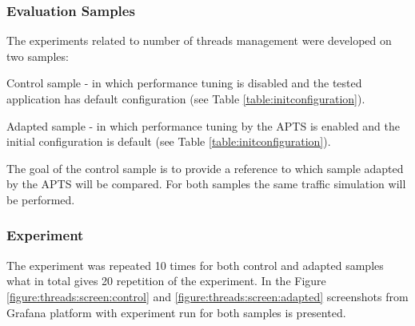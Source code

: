 \documentclass[12pt,a4paper]{article}
\let\tempone\itemize
\let\temptwo\enditemize
\renewenvironment{itemize}{\tempone\addtolength{\itemsep}{-0.4\baselineskip}}{\temptwo}
\begin{document}
 
\subsubsection{Evaluation Samples}

The experiments related to number of threads management were developed on two samples:
\begin{itemize}
\item Control sample - in which performance tuning is disabled and the tested application has default  configuration (see Table \ref{table:initconfiguration}).  
\item Adapted sample - in which performance tuning by the APTS is enabled and the initial configuration is default (see Table \ref{table:initconfiguration}).
\end{itemize}

The goal of the control sample is to provide a reference to which sample adapted by the APTS will be compared. For both samples the same traffic simulation will be performed.
 
\subsubsection{Experiment} 

The experiment was repeated 10 times for both control and adapted samples what in total gives 20 repetition of the experiment. In the Figure \ref{figure:threads:screen:control} and \ref{figure:threads:screen:adapted} screenshots from Grafana platform with experiment run for both samples is presented.
\end{document}
